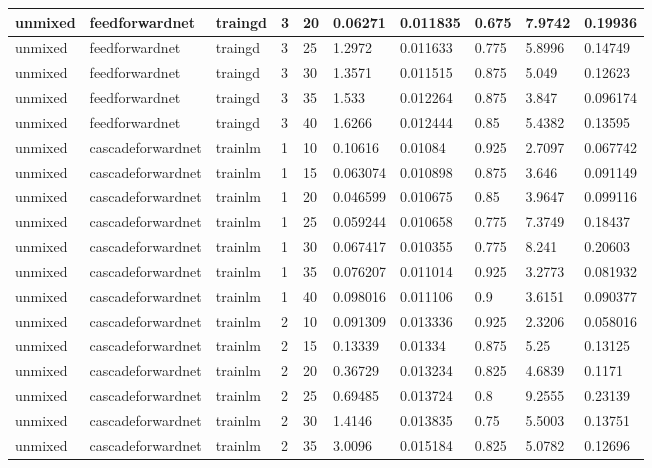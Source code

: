 \begin{longtable}{lllllllll}
unmixed & feedforwardnet & traingd & 3 & 20 & 0.06271 & 0.011835 & 0.675 & 7.9742 & 0.19936 \\ \hline 
unmixed & feedforwardnet & traingd & 3 & 25 & 1.2972 & 0.011633 & 0.775 & 5.8996 & 0.14749 \\ \hline 
unmixed & feedforwardnet & traingd & 3 & 30 & 1.3571 & 0.011515 & 0.875 & 5.049 & 0.12623 \\ \hline 
unmixed & feedforwardnet & traingd & 3 & 35 & 1.533 & 0.012264 & 0.875 & 3.847 & 0.096174 \\ \hline 
unmixed & feedforwardnet & traingd & 3 & 40 & 1.6266 & 0.012444 & 0.85 & 5.4382 & 0.13595 \\ \hline 
unmixed & cascadeforwardnet & trainlm & 1 & 10 & 0.10616 & 0.01084 & 0.925 & 2.7097 & 0.067742 \\ \hline 
unmixed & cascadeforwardnet & trainlm & 1 & 15 & 0.063074 & 0.010898 & 0.875 & 3.646 & 0.091149 \\ \hline 
unmixed & cascadeforwardnet & trainlm & 1 & 20 & 0.046599 & 0.010675 & 0.85 & 3.9647 & 0.099116 \\ \hline 
unmixed & cascadeforwardnet & trainlm & 1 & 25 & 0.059244 & 0.010658 & 0.775 & 7.3749 & 0.18437 \\ \hline 
unmixed & cascadeforwardnet & trainlm & 1 & 30 & 0.067417 & 0.010355 & 0.775 & 8.241 & 0.20603 \\ \hline 
unmixed & cascadeforwardnet & trainlm & 1 & 35 & 0.076207 & 0.011014 & 0.925 & 3.2773 & 0.081932 \\ \hline 
unmixed & cascadeforwardnet & trainlm & 1 & 40 & 0.098016 & 0.011106 & 0.9 & 3.6151 & 0.090377 \\ \hline 
unmixed & cascadeforwardnet & trainlm & 2 & 10 & 0.091309 & 0.013336 & 0.925 & 2.3206 & 0.058016 \\ \hline 
unmixed & cascadeforwardnet & trainlm & 2 & 15 & 0.13339 & 0.01334 & 0.875 & 5.25 & 0.13125 \\ \hline 
unmixed & cascadeforwardnet & trainlm & 2 & 20 & 0.36729 & 0.013234 & 0.825 & 4.6839 & 0.1171 \\ \hline 
unmixed & cascadeforwardnet & trainlm & 2 & 25 & 0.69485 & 0.013724 & 0.8 & 9.2555 & 0.23139 \\ \hline 
unmixed & cascadeforwardnet & trainlm & 2 & 30 & 1.4146 & 0.013835 & 0.75 & 5.5003 & 0.13751 \\ \hline 
unmixed & cascadeforwardnet & trainlm & 2 & 35 & 3.0096 & 0.015184 & 0.825 & 5.0782 & 0.12696 \\ \hline 

\end{longtable}

